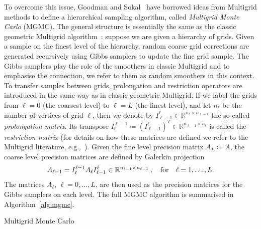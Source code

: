 \documentclass[
fontsize=11pt,
paper=a4,
numbers=noenddot
]{scrartcl}
\begin{document}
To overcome this issue, Goodman and Sokal~\cite{goodmansokal} have borrowed ideas from Multigrid methods to define a hierarchical sampling algorithm, called \emph{Multigrid Monte Carlo} (MGMC). The general structure is essentially the same as the classic geometric Multigrid algorithm~\cite{hackbuschMultiGridMethodsApplications1985}: suppose we are given a hierarchy of grids. Given a sample on the finest level of the hierarchy, random coarse grid corrections are generated recursively using Gibbs samplers to update the fine grid sample. The Gibbs samplers play the role of the smoothers in classic Multigrid and to emphasise the connection, we refer to them as random smoothers in this context. To transfer samples between grids, prolongation and restriction operators are introduced in the same way as in classic  geometric Multigrid. If we label the grids from $\ell = 0$ (the coarsest level) to $\ell = L$ (the finest level), and let $n_\ell$ be the number of vertices of grid $\ell$, then we denote by $I_{\ell-1}^\ell \in \mathbb{R}^{n_\ell \times n_{\ell - 1}}$ the so-called \emph{prolongation matrix}. Its transpose $I_{\ell}^{\ell-1} \coloneqq {(I_{\ell-1}^\ell)}^T \in \mathbb{R}^{n_{\ell - 1} \times n_{\ell}}$ is called the \emph{restriction matrix} (for details on how these matrices are defined we refer to the Multigrid literature, e.g.,~\cite{hackbuschMultiGridMethodsApplications1985}). Given the fine level precision matrix $A_L \coloneqq A$, the coarse level precision matrices are defined by Galerkin projection
\begin{equation}
  \label{eq:galerkin}
    A_{\ell-1} = I_\ell^{\ell - 1} A_\ell I_{\ell-1}^\ell \in \mathbb{R}^{n_{\ell-1} \times n_{\ell-1}}\,, \quad \text{for\quad$\ell = 1, \dotsc, L$.}
\end{equation}
The matrices $A_\ell$, $\ell = 0, \dotsc, L$, are then used as the precision matrices for the Gibbs samplers on each level. The full MGMC algorithm is summarised in Algorithm~\ref{alg:mgmc}.

\begin{algorithm}
    \DontPrintSemicolon



    \SetAlgoLined

    \caption{Multigrid Monte Carlo}\label{alg:mgmc}
\end{algorithm}
\end{document}
